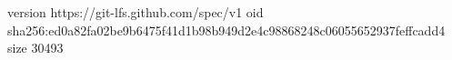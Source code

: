 version https://git-lfs.github.com/spec/v1
oid sha256:ed0a82fa02be9b6475f41d1b98b949d2e4c98868248c06055652937feffcadd4
size 30493
